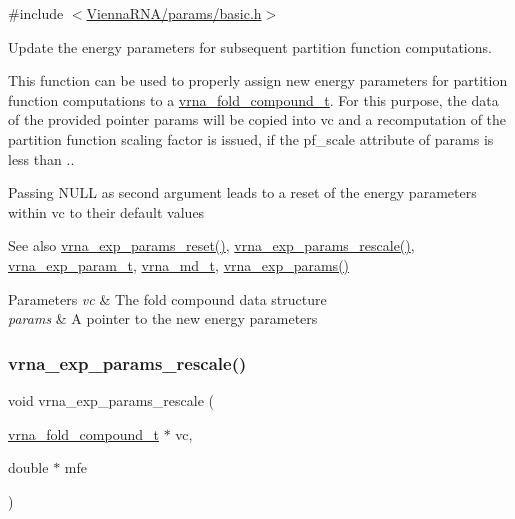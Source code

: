 {\ttfamily \#include $<$\mbox{\hyperlink{params_2basic_8h}{Vienna\+R\+N\+A/params/basic.\+h}}$>$}



Update the energy parameters for subsequent partition function computations. 

This function can be used to properly assign new energy parameters for partition function computations to a \mbox{\hyperlink{group__fold__compound_ga1b0cef17fd40466cef5968eaeeff6166}{vrna\+\_\+fold\+\_\+compound\+\_\+t}}. For this purpose, the data of the provided pointer {\ttfamily params} will be copied into {\ttfamily vc} and a recomputation of the partition function scaling factor is issued, if the {\ttfamily pf\+\_\+scale} attribute of {\ttfamily params} is less than {.}.

Passing N\+U\+LL as second argument leads to a reset of the energy parameters within vc to their default values

\begin{DoxySeeAlso}{See also}
\mbox{\hyperlink{group__energy__parameters_gaa5409218068be84d7b50c78fbdaa85a9}{vrna\+\_\+exp\+\_\+params\+\_\+reset()}}, \mbox{\hyperlink{group__energy__parameters_gad607bc3a5b5da16400e2ca4ea5560233}{vrna\+\_\+exp\+\_\+params\+\_\+rescale()}}, \mbox{\hyperlink{group__energy__parameters_ga01d8b92fe734df8d79a6169482c7d8d8}{vrna\+\_\+exp\+\_\+param\+\_\+t}}, \mbox{\hyperlink{group__model__details_ga1f8a10e12a0a1915f2a4eff0b28ea17c}{vrna\+\_\+md\+\_\+t}}, \mbox{\hyperlink{group__energy__parameters_gab1f3016f96aa96bff020cdd904605afa}{vrna\+\_\+exp\+\_\+params()}}
\end{DoxySeeAlso}

\begin{DoxyParams}{Parameters}
{\em vc} & The fold compound data structure \\
\hline
{\em params} & A pointer to the new energy parameters \\
\hline
\end{DoxyParams}
\mbox{\label{group__energy__parameters_gad607bc3a5b5da16400e2ca4ea5560233}} 
\subsubsection{\texorpdfstring{vrna\_exp\_params\_rescale()}{vrna\_exp\_params\_rescale()}}
{\footnotesize\ttfamily void vrna\+\_\+exp\+\_\+params\+\_\+rescale (\begin{DoxyParamCaption}\item[{\mbox{\hyperlink{group__fold__compound_ga1b0cef17fd40466cef5968eaeeff6166}{vrna\+\_\+fold\+\_\+compound\+\_\+t}} $\ast$}]{vc,  }\item[{double $\ast$}]{mfe }\end{DoxyParamCaption})}



